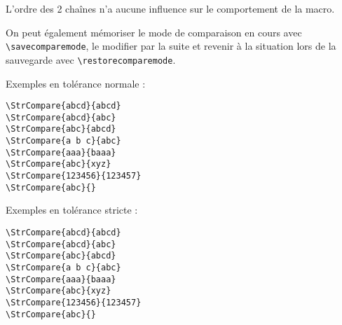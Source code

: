 \documentclass[a4paper,10pt]{article}
\newcommand\styleexemple{\small\vskip4pt}
\newcommand\verbinline{\lstinline[basicstyle=\normalsize\ttfamily]}
\begin{document}
L'ordre des 2 chaînes n'a aucune influence sur le comportement de la macro.

\medskip On peut également mémoriser le mode de comparaison en cours avec \verbinline|\savecomparemode|, le modifier par la suite et revenir à la situation lors de la sauvegarde avec \verbinline|\restorecomparemode|.\medskip

Exemples en tolérance normale :\par\nobreak
\begin{minipage}[t]{0.65\linewidth}
\comparenormal
\begin{lstlisting}
\StrCompare{abcd}{abcd}
\StrCompare{abcd}{abc}
\StrCompare{abc}{abcd}
\StrCompare{a b c}{abc}
\StrCompare{aaa}{baaa}
\StrCompare{abc}{xyz}
\StrCompare{123456}{123457}
\StrCompare{abc}{}
\end{lstlisting}%
\end{minipage}\hfill
\begin{minipage}[t]{0.35\linewidth}
	\styleexemple
	\comparenormal
	\par
	\par
	\par
	\par
	\par
	\par
	\par
\end{minipage}%
\medskip

Exemples en tolérance stricte :\par\nobreak
\begin{minipage}[t]{0.65\linewidth}
\comparestrict
\begin{lstlisting}
\StrCompare{abcd}{abcd}
\StrCompare{abcd}{abc}
\StrCompare{abc}{abcd}
\StrCompare{a b c}{abc}
\StrCompare{aaa}{baaa}
\StrCompare{abc}{xyz}
\StrCompare{123456}{123457}
\StrCompare{abc}{}
\end{lstlisting}%
\end{minipage}\hfill
\begin{minipage}[t]{0.35\linewidth}
	\styleexemple
	\comparestrict
	\par
	\par
	\par
	\par
	\par
	\par
	\par
\end{minipage}%
\end{document}
